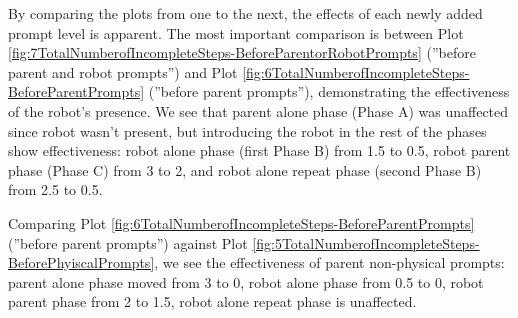 By comparing the plots from one to the next, the effects of each newly added prompt level is apparent.  The most important comparison is between Plot \ref{fig:7TotalNumberofIncompleteSteps-BeforeParentorRobotPrompts} (''before parent and robot prompts'') and Plot \ref{fig:6TotalNumberofIncompleteSteps-BeforeParentPrompts} (''before parent prompts''), demonstrating the effectiveness of the robot's presence.  We see that parent alone phase (Phase A) was unaffected since robot wasn't present, but introducing the robot in the rest of the phases show effectiveness: robot alone phase (first Phase B) from 1.5 to 0.5, robot parent phase (Phase C) from 3 to 2, and robot alone repeat phase (second Phase B) from 2.5 to 0.5.

Comparing Plot \ref{fig:6TotalNumberofIncompleteSteps-BeforeParentPrompts} (''before parent prompts'') against Plot \ref{fig:5TotalNumberofIncompleteSteps-BeforePhyiscalPrompts}, we see the effectiveness of parent non-physical prompts: parent alone phase moved from 3 to 0, robot alone phase from 0.5 to 0, robot parent phase from 2 to 1.5, robot alone repeat phase is unaffected.
